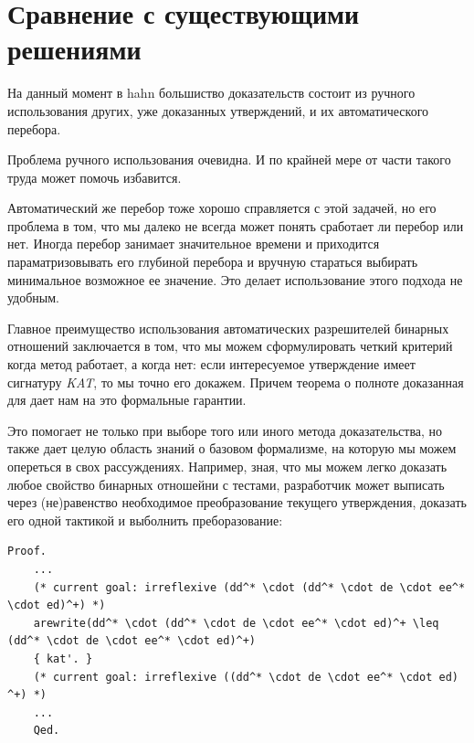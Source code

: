 \documentclass[times
              ]{itmo-student-thesis}
\begin{document}
  \newpage %
  \section{Сравнение с существующими решениями}

    На данный момент в hahn большиство доказательств состоит из ручного использования других, уже
    доказанных утверждений, и их автоматического перебора.

    Проблема ручного использования очевидна. И по крайней мере от части такого труда 
    может помочь избавится.

    Автоматический же перебор тоже хорошо справляется с этой задачей, но его проблема в том, что мы
    далеко не всегда может понять сработает ли перебор или нет. Иногда перебор занимает значительное
    времени и приходится параматризовывать его глубиной перебора и вручную стараться выбирать
    минимальное возможное ее значение. Это делает использование этого подхода не удобным.

    Главное преимущество использования автоматических разрешителей бинарных отношений заключается в
    том, что мы можем сформулировать четкий критерий когда метод работает, а когда нет: если
    интересуемое утверждение имеет сигнатуру \textit{KAT}, то мы точно его докажем. Причем теорема о
    полноте доказанная для  дает нам на это формальные гарантии.

    Это помогает не только при выборе того или иного метода доказательства, но также дает целую область
    знаний о базовом формализме, на которую мы можем опереться в свох рассуждениях. Например, зная, что
    мы можем легко доказать любое свойство бинарных отношейни с тестами, разработчик может выписать через
    (не)равенство необходимое преобразование текущего утверждения, доказать его одной тактикой
     и выболнить преборазование:

    \begin{lstlisting}[float=false, mathescape=true, language=coq,
      caption={Пример доказательства вспомогательного утверждения, необходимого для преобразования, с
        помощью \textit{KAT}}, label={lst:arewrite}]
    Proof.  
    ...
    (* current goal: irreflexive (dd^* \cdot (dd^* \cdot de \cdot ee^* \cdot ed)^+) *)  
    arewrite(dd^* \cdot (dd^* \cdot de \cdot ee^* \cdot ed)^+ \leq (dd^* \cdot de \cdot ee^* \cdot ed)^+)
    { kat'. }
    (* current goal: irreflexive ((dd^* \cdot de \cdot ee^* \cdot ed) ^+) *)
    ...
    Qed.
    \end{lstlisting}
  
\end{document}
